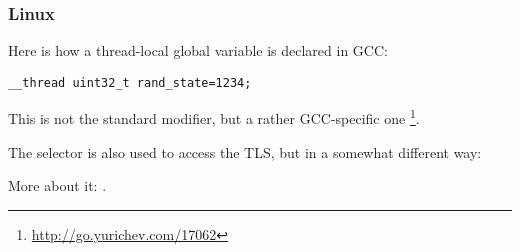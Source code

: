 \subsubsection{Linux}

Here is how a thread-local global variable is declared in GCC:

\begin{lstlisting}
__thread uint32_t rand_state=1234;
\end{lstlisting}

This is not the standard \CCpp modifier, but a rather GCC-specific one
\footnote{\url{http://go.yurichev.com/17062}}.


The  selector is also used to access the \ac{TLS}, but in a somewhat different way:




More about it: \DrepperTLS.

